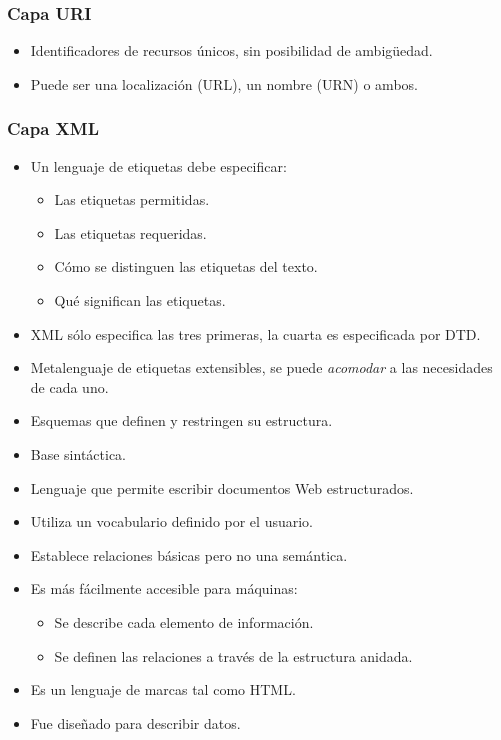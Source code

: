 \documentclass[a4paper,12pt,twoside,final,spanish]{article}
\begin{document}
\subsubsection{Capa URI}

\begin{itemize}
\item Identificadores de recursos únicos, sin posibilidad de ambigüedad.
\item Puede ser una localización (URL), un nombre (URN) o ambos.
\end{itemize}

\subsubsection{Capa XML}

\begin{itemize}
\item Un lenguaje de etiquetas debe especificar:
	\begin{itemize}
	\item Las etiquetas permitidas.
	\item Las etiquetas requeridas.
	\item Cómo se distinguen las etiquetas del texto.
	\item Qué significan las etiquetas.
	\end{itemize}
\item XML sólo especifica las tres primeras, la cuarta es especificada por DTD.
\item Metalenguaje de etiquetas extensibles, se puede \textit{acomodar} a las necesidades de cada uno.
\item Esquemas que definen y restringen su estructura.
\item Base sintáctica.
\item Lenguaje que permite escribir documentos Web estructurados.
\item Utiliza un vocabulario definido por el usuario.
\item Establece relaciones básicas pero no una semántica.
\item Es más fácilmente accesible para máquinas:
	\begin{itemize}
	\item  Se describe cada elemento de información.
	\item Se definen las relaciones a través de la estructura anidada. 
	\end{itemize}
\item Es un lenguaje de marcas tal como HTML.
\item Fue diseñado para describir datos.

\end{itemize}
\end{document}

